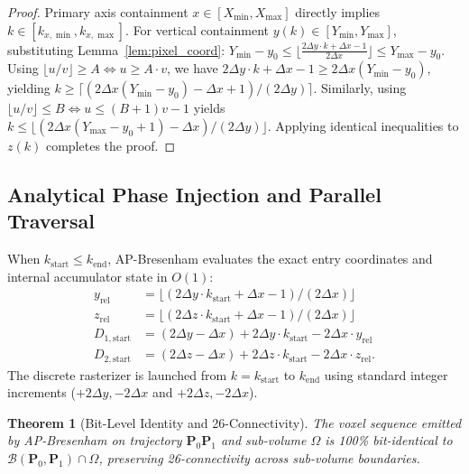 \documentclass[11pt]{article}
\newtheorem{theorem}{Theorem}
\begin{document}
\begin{proof}
Primary axis containment $x \in [X_{\min}, X_{\max}]$ directly implies $k \in [k_{x,\min}, k_{x,\max}]$. For vertical containment $y(k) \in [Y_{\min}, Y_{\max}]$, substituting Lemma~\ref{lem:pixel_coord}: $Y_{\min} - y_0 \le \lfloor \frac{2\Delta y \cdot k + \Delta x - 1}{2\Delta x} \rfloor \le Y_{\max} - y_0$. Using $\lfloor u / v \rfloor \ge A \iff u \ge A \cdot v$, we have $2\Delta y \cdot k + \Delta x - 1 \ge 2\Delta x (Y_{\min} - y_0)$, yielding $k \ge \lceil (2\Delta x (Y_{\min} - y_0) - \Delta x + 1) / (2\Delta y) \rceil$. Similarly, using $\lfloor u / v \rfloor \le B \iff u \le (B + 1) v - 1$ yields $k \le \lfloor (2\Delta x (Y_{\max} - y_0 + 1) - \Delta x) / (2\Delta y) \rfloor$. Applying identical inequalities to $z(k)$ completes the proof.
\end{proof}

\subsection*{Analytical Phase Injection and Parallel Traversal}
When $k_{\mathrm{start}} \le k_{\mathrm{end}}$, AP-Bresenham evaluates the exact entry coordinates and internal accumulator state in $O(1)$:
\begin{align}
    y_{\mathrm{rel}} &= \lfloor (2\Delta y \cdot k_{\mathrm{start}} + \Delta x - 1) / (2\Delta x) \rfloor \\
    z_{\mathrm{rel}} &= \lfloor (2\Delta z \cdot k_{\mathrm{start}} + \Delta x - 1) / (2\Delta x) \rfloor \\
    D_{1,\mathrm{start}} &= (2\Delta y - \Delta x) + 2\Delta y \cdot k_{\mathrm{start}} - 2\Delta x \cdot y_{\mathrm{rel}} \\
    D_{2,\mathrm{start}} &= (2\Delta z - \Delta x) + 2\Delta z \cdot k_{\mathrm{start}} - 2\Delta x \cdot z_{\mathrm{rel}}.
\end{align}
The discrete rasterizer is launched from $k = k_{\mathrm{start}}$ to $k_{\mathrm{end}}$ using standard integer increments ($+2\Delta y, -2\Delta x$ and $+2\Delta z, -2\Delta x$).

\begin{theorem}[Bit-Level Identity and 26-Connectivity]
\label{thm:bit_identity}
The voxel sequence emitted by AP-Bresenham on trajectory $\mathbf{P}_0\mathbf{P}_1$ and sub-volume $\Omega$ is 100\% bit-identical to $\mathcal{B}(\mathbf{P}_0, \mathbf{P}_1) \cap \Omega$, preserving 26-connectivity across sub-volume boundaries.
\end{theorem}
\end{document}
